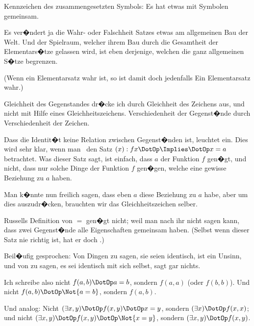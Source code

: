 \begin{propositions}
{Kennzeichen des zusammengesetzten Symbols:
Es hat etwas mit  Symbolen gemeinsam.}


{Es ver�ndert ja die Wahr- oder Falschheit 
Satzes etwas am allgemeinen Bau der Welt. Und
der Spielraum, welcher ihrem Bau durch die
Gesamtheit der Elementars�tze gelassen wird, ist
eben derjenige, welchen die ganz allgemeinen
S�tze begrenzen.

(Wenn ein Elementarsatz wahr ist, so ist damit
doch jedenfalls Ein Elementarsatz  wahr.)}


{{\verystretchyspace
Gleichheit des Gegenstandes dr�cke ich durch
Gleichheit des Zeichens aus, und nicht mit Hilfe
eines Gleichheitszeichens. Verschiedenheit der
\enlargethispage{7pt} %
Gegenst�nde durch Verschiedenheit der Zeichen.}}


{Dass die Identit�t keine Relation zwischen Gegenst�nden
ist, leuchtet ein. Dies wird sehr klar,
wenn man \zumBeispiel\ den Satz \glqq{}$(x) : fx \DotOp \Implies \DotOp x = a$\grqq{}
betrachtet. Was dieser Satz sagt, ist einfach,
dass  $a$ der Funktion $f$ gen�gt, und nicht,
dass nur solche Dinge der Funktion $f$ gen�gen,
welche eine gewisse Beziehung zu $a$ haben.

Man k�nnte nun freilich sagen, dass eben 
$a$ diese Beziehung zu $a$ habe, aber um dies auszudr�cken,
brauchten wir das Gleichheitszeichen
selber.}


{Russells Definition von \glqq{}$=$\grqq{} gen�gt nicht; weil
man nach ihr nicht sagen kann, dass zwei Gegenst�nde
alle Eigenschaften gemeinsam haben.
(Selbst wenn dieser Satz nie richtig ist, hat er
doch .)}


{Beil�ufig gesprochen: Von  Dingen zu
sagen, sie seien identisch, ist ein Unsinn, und von
 zu sagen, es sei identisch mit sich selbst,
sagt gar nichts.}


{Ich schreibe also nicht \glqq{}$f(a,b) \DotOp a = b$\grqq{}, sondern
\glqq{}$f(a,a)$\grqq{} (oder \glqq{}$f(b,b)$\grqq{}). Und nicht \glqq{}$f(a,b) \DotOp \Not{a = b}$\grqq{},
sondern \glqq{}$f(a,b)$\grqq{}.}


{Und analog: Nicht \glqq{}$(\exists x,y) \DotOp f(x,y) \DotOp x = y$\grqq{},
sondern \glqq{}$(\exists x) \DotOp f(x,x)$\grqq{}; und nicht \glqq{}$(\exists x,y) \DotOp f(x,y) \DotOp
\Not{x = y}$\grqq{}, sondern \glqq{}$(\exists x,y) \DotOp f(x,y)$\grqq{}.

}
\end{propositions}
